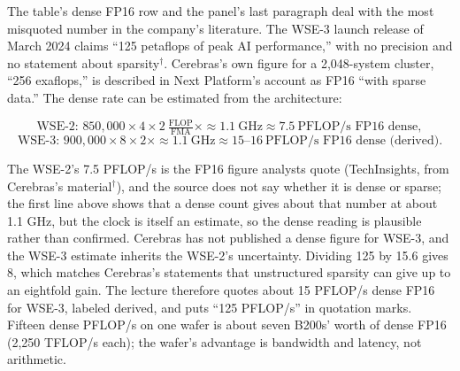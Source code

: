\documentclass[11pt,letterpaper]{article}
\newenvironment{formulas}{\begin{tcolorbox}[formulabox]}{\end{tcolorbox}}
\begin{document}
The table's dense FP16 row and the panel's last paragraph deal with the most misquoted number in the company's literature. The WSE-3 launch release of March 2024 claims ``125 petaflops of peak AI performance,'' with no precision and no statement about sparsity$^\dagger$. Cerebras's own figure for a 2{,}048-system cluster, ``256 exaflops,'' is described in Next Platform's account as FP16 ``with sparse data.'' The dense rate can be estimated from the architecture:
\begin{formulas}
\[
\text{WSE-2: } 850{,}000 \times 4 \times 2\ \tfrac{\text{FLOP}}{\text{FMA}} \times {\approx}1.1\ \text{GHz} \approx 7.5\ \text{PFLOP/s FP16 dense},
\]
\[
\text{WSE-3: } 900{,}000 \times 8 \times 2 \times {\approx}1.1\ \text{GHz} \approx 15\text{--}16\ \text{PFLOP/s FP16 dense (derived)}.
\]
\end{formulas}
The WSE-2's 7.5 PFLOP/s is the FP16 figure analysts quote (TechInsights, from Cerebras's material$^\dagger$), and the source does not say whether it is dense or sparse; the first line above shows that a dense count gives about that number at about 1.1 GHz, but the clock is itself an estimate, so the dense reading is plausible rather than confirmed. Cerebras has not published a dense figure for WSE-3, and the WSE-3 estimate inherits the WSE-2's uncertainty. Dividing 125 by 15.6 gives 8, which matches Cerebras's statements that unstructured sparsity can give up to an eightfold gain. The lecture therefore quotes about 15 PFLOP/s dense FP16 for WSE-3, labeled derived, and puts ``125 PFLOP/s'' in quotation marks. Fifteen dense PFLOP/s on one wafer is about seven B200s' worth of dense FP16 (2{,}250 TFLOP/s each); the wafer's advantage is bandwidth and latency, not arithmetic.
\end{document}
